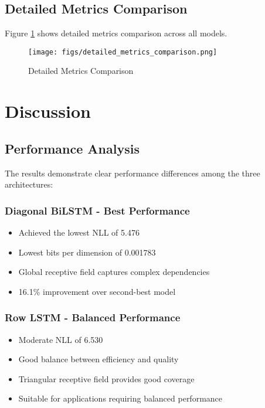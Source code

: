 \documentclass[norunningheads]{llncs}
\begin{document}
\subsection{Detailed Metrics Comparison}

Figure \ref{fig:detailed_metrics_comparison} shows detailed metrics comparison across all models.

\begin{figure}[h]
\centering
\texttt{[image: figs/detailed\_metrics\_comparison.png]}
\caption{Detailed Metrics Comparison}
\label{fig:detailed_metrics_comparison}
\end{figure}

\section{Discussion}

\subsection{Performance Analysis}

The results demonstrate clear performance differences among the three architectures:

\subsubsection{Diagonal BiLSTM - Best Performance}
\begin{itemize}
\item Achieved the lowest NLL of 5.476
\item Lowest bits per dimension of 0.001783
\item Global receptive field captures complex dependencies
\item 16.1\% improvement over second-best model
\end{itemize}

\subsubsection{Row LSTM - Balanced Performance}
\begin{itemize}
\item Moderate NLL of 6.530
\item Good balance between efficiency and quality
\item Triangular receptive field provides good coverage
\item Suitable for applications requiring balanced performance
\end{itemize}
\end{document}
